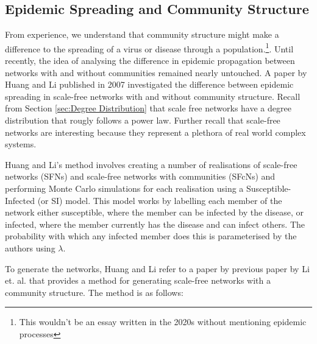 \subsection{Epidemic Spreading and Community Structure}\label{sec:epidemics}
From experience, we understand that community structure might make a difference to the spreading of a virus or disease through a population.\footnote{This wouldn't be an essay written in the 2020s without mentioning epidemic processes}. Until recently, the idea of analysing the difference in epidemic propagation between networks with and without communities remained nearly untouched. A paper by Huang and Li published in 2007\cite{Huang_2007} investigated the difference between epidemic spreading in scale-free networks with and without community structure. Recall from Section \ref{sec:Degree Distribution} that scale free networks have a degree distribution that rougly follows a power law. Further recall that scale-free networks are interesting because they represent a plethora of real world complex systems.

Huang and Li's method involves creating a number of realisations of scale-free networks (SFNs) and scale-free networks with communities (SFcNs) and performing Monte Carlo simulations for each realisation using a Susceptible-Infected (or SI) model. This model works by labelling each member of the network either susceptible, where the member can be infected by the disease, or infected, where the member currently has the disease and can infect others. The probability with which any infected member does this is parameterised by the authors using $\lambda$.

To generate the networks, Huang and Li refer to a paper by previous paper by Li et. al.\cite{Li_2005} that provides a method for generating scale-free networks with a community structure. The method is as follows:

